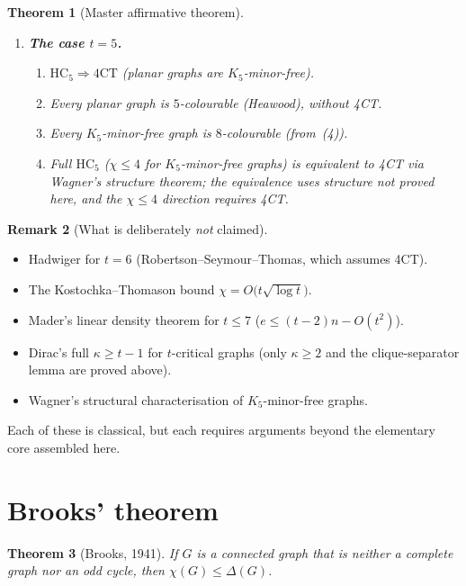 \documentclass[11pt]{article}
\newtheorem{theorem}{Theorem}[section]
\theoremstyle{definition}
\newtheorem{remark}[theorem]{Remark}
\begin{document}
\begin{theorem}[Master affirmative theorem]
\begin{enumerate}
\item \textbf{The case \(t=5\).}
\begin{enumerate}
\item \(\mathrm{HC}_5\Rightarrow\mathrm{4CT}\) (planar graphs are \(K_5\)-minor-free).
\item Every planar graph is \(5\)-colourable (Heawood), without 4CT.
\item Every \(K_5\)-minor-free graph is \(8\)-colourable (from~(4)).
\item Full \(\mathrm{HC}_5\) (\(\chi\le 4\) for \(K_5\)-minor-free graphs) is
equivalent to 4CT via Wagner's structure theorem; the equivalence uses
structure not proved here, and the \(\chi\le 4\) direction requires 4CT.
\end{enumerate}
\end{enumerate}
\end{theorem}

\begin{remark}[What is deliberately \emph{not} claimed]
\begin{itemize}
\item Hadwiger for \(t=6\) (Robertson--Seymour--Thomas, which assumes 4CT).
\item The Kostochka--Thomason bound \(\chi=O\bigl(t\sqrt{\log t}\bigr)\).
\item Mader's linear density theorem for \(t\le 7\) (\(e\le(t-2)n-O(t^2)\)).
\item Dirac's full \(\kappa\ge t-1\) for \(t\)-critical graphs (only \(\kappa\ge 2\)
and the clique-separator lemma are proved above).
\item Wagner's structural characterisation of \(K_5\)-minor-free graphs.
\end{itemize}
Each of these is classical, but each requires arguments beyond the elementary
core assembled here.
\end{remark}

\appendix
\section{Brooks' theorem}\label{app:brooks}

\begin{theorem}[Brooks, 1941]\label{thm:brooks}
If \(G\) is a connected graph that is neither a complete graph nor an odd cycle,
then \(\chi(G)\le\Delta(G)\).
\end{theorem}
\end{document}
